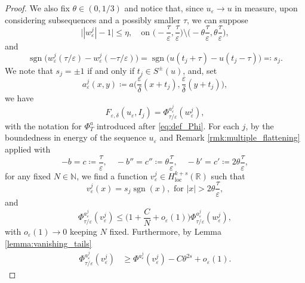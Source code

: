 \documentclass{article}
\theoremstyle{definition}
\newcommand{\R}{\mathbb{R}}
\newcommand{\N}{\mathbb{N}}
\newcommand{\e}{\varepsilon}
\newcommand{\del}{\delta}
\def\e{\varepsilon}
\newcommand{\sgn}{\operatorname{sgn}}
\begin{document}
\begin{proof}
We also fix $\theta\in (0,1/3)$  and notice that, since $u_\e\rightarrow u$ in measure, upon considering subsequences and a possibly smaller $\tau$, we can suppose
\begin{equation*}
    \big||w^j_\e|-1\big|\leq \eta, \quad\text{on }\Big({-}\frac{\tau}{\e}, \frac{\tau}{\e}\Big)\setminus\Big({-}\theta\frac{\tau}{\e}, \theta\frac{\tau}{\e}\Big),
\end{equation*}
and \begin{equation*}
    \sgn\big(w^j_\e( \tau/\e )- w^j_\e(- \tau/\e)\big)=\sgn\big(u(t_j+ \tau)- u(t_j- \tau)\big)\eqqcolon s_j.
\end{equation*}
We note that $s_j=\pm 1$ if and only if $t_j\in S^\pm(u)$, and, set 
\[a^{j}_{\e}(x,y)\coloneqq a \Big(\frac{\e}{\delta}(x+t_j),\frac{\e}{\delta}(y+t_j)\Big),\] 
we have
    \begin{equation}\label{eq:F_Phi}
        F_{\e,\del}(u_\e, I_j)=\Phi^{a^{j}_{\scriptstyle\e}}_{\tau/\e}(w_\e^j), 
    \end{equation}
    with the notation for $\Phi^a_T$ introduced after \eqref{eq:def_Phi}. For each $j$,  by   the boundedness in energy of the sequence $u_\e$ and Remark \ref{rmk:multiple_flattening} applied with
   \begin{equation*}
        -b=c\coloneqq \frac{\tau}{\e},\quad -b''=c''\coloneqq \theta\frac{\tau}{\e},\quad -b'=c'\coloneqq 2\theta\frac{\tau}{\e}, 
   \end{equation*}
  for any fixed $N\in\N$, we find a function $v_\e^j \in H^{k+s}_{\operatorname{loc}}(\R)$ such that 
    \begin{equation*}
       v_\e^j(x) = s_j\sgn(x)  , \text{ for }|x| > 2\theta\frac{\tau}{\e} ,
    \end{equation*}
 and
 \begin{equation}\label{eq:lower_bound_flattening}
     \Phi^{a^{j}_{\scriptstyle\e}}_{\tau/ \e}(v_\e^j)\leq \Big(1+\frac{C}{N}+o_\e(1)\Big)\Phi^{a^{j}_{\scriptstyle\e}}_{\tau/ \e}(w^j_\e),
 \end{equation}
 with $o_\e(1)\to 0$ keeping $N$ fixed. Furthermore, by Lemma \ref{lemma:vanishing_tails} 
    \begin{equation}\label{eq:lower_bound_tails}
        \begin{split}
             \Phi^{a^{j}_{\scriptstyle\e}}_{\tau/ \e}(v_\e^j)&\geq \Phi^{a^{j}_{\scriptstyle\e}
             } (v_\e^j)- C\theta^{2s} + o_\e(1).
        \end{split}
    \end{equation}


\end{proof}
\end{document}
